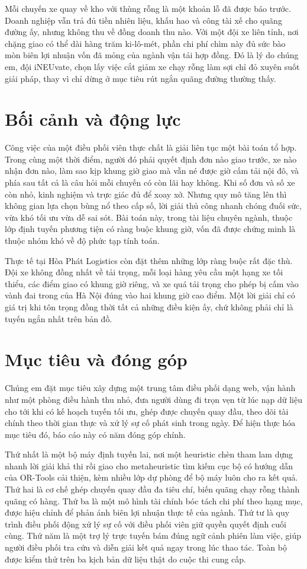 \documentclass[12pt,a4paper,oneside]{report}
\begin{document}
Mỗi chuyến xe quay về kho với thùng rỗng là một khoản lỗ đã được báo trước. Doanh nghiệp vẫn trả đủ tiền nhiên liệu, khấu hao và công tài xế cho quãng đường ấy, nhưng không thu về đồng doanh thu nào. Với một đội xe liên tỉnh, nơi chặng giao có thể dài hàng trăm ki-lô-mét, phần chi phí chìm này đủ sức bào mòn biên lợi nhuận vốn đã mỏng của ngành vận tải hợp đồng. Đó là lý do chúng em, đội iNEUvate, chọn lấy việc cắt giảm xe chạy rỗng làm sợi chỉ đỏ xuyên suốt giải pháp, thay vì chỉ dừng ở mục tiêu rút ngắn quãng đường thường thấy.

\section{Bối cảnh và động lực}
Công việc của một điều phối viên thực chất là giải liên tục một bài toán tổ hợp. Trong cùng một thời điểm, người đó phải quyết định đơn nào giao trước, xe nào nhận đơn nào, làm sao kịp khung giờ giao mà vẫn né được giờ cấm tải nội đô, và phía sau tất cả là câu hỏi mỗi chuyến có còn lãi hay không. Khi số đơn và số xe còn nhỏ, kinh nghiệm và trực giác đủ để xoay xở. Nhưng quy mô tăng lên thì không gian lựa chọn bùng nổ theo cấp số, lời giải thủ công nhanh chóng đuối sức, vừa khó tối ưu vừa dễ sai sót. Bài toán này, trong tài liệu chuyên ngành, thuộc lớp định tuyến phương tiện có ràng buộc khung giờ, vốn đã được chứng minh là thuộc nhóm khó về độ phức tạp tính toán.

Thực tế tại Hòa Phát Logistics còn đặt thêm những lớp ràng buộc rất đặc thù. Đội xe không đồng nhất về tải trọng, mỗi loại hàng yêu cầu một hạng xe tối thiểu, các điểm giao có khung giờ riêng, và xe quá tải trọng cho phép bị cấm vào vành đai trong của Hà Nội đúng vào hai khung giờ cao điểm. Một lời giải chỉ có giá trị khi tôn trọng đồng thời tất cả những điều kiện ấy, chứ không phải chỉ là tuyến ngắn nhất trên bản đồ.

\section{Mục tiêu và đóng góp}
Chúng em đặt mục tiêu xây dựng một trung tâm điều phối dạng web, vận hành như một phòng điều hành thu nhỏ, đưa người dùng đi trọn vẹn từ lúc nạp dữ liệu cho tới khi có kế hoạch tuyến tối ưu, ghép được chuyến quay đầu, theo dõi tài chính theo thời gian thực và xử lý sự cố phát sinh trong ngày. Để hiện thực hóa mục tiêu đó, báo cáo này có năm đóng góp chính.

Thứ nhất là một bộ máy định tuyến lai, nơi một heuristic chèn tham lam dựng nhanh lời giải khả thi rồi giao cho metaheuristic tìm kiếm cục bộ có hướng dẫn của OR-Tools cải thiện, kèm nhiều lớp dự phòng để bộ máy luôn cho ra kết quả. Thứ hai là cơ chế ghép chuyến quay đầu đa tiêu chí, biến quãng chạy rỗng thành quãng có hàng. Thứ ba là một mô hình tài chính bóc tách chi phí theo hạng mục, được hiệu chỉnh để phản ánh biên lợi nhuận thực tế của ngành. Thứ tư là quy trình điều phối động xử lý sự cố với điều phối viên giữ quyền quyết định cuối cùng. Thứ năm là một trợ lý trực tuyến bám đúng ngữ cảnh phiên làm việc, giúp người điều phối tra cứu và diễn giải kết quả ngay trong lúc thao tác. Toàn bộ được kiểm thử trên ba kịch bản dữ liệu thật do cuộc thi cung cấp.
\end{document}
